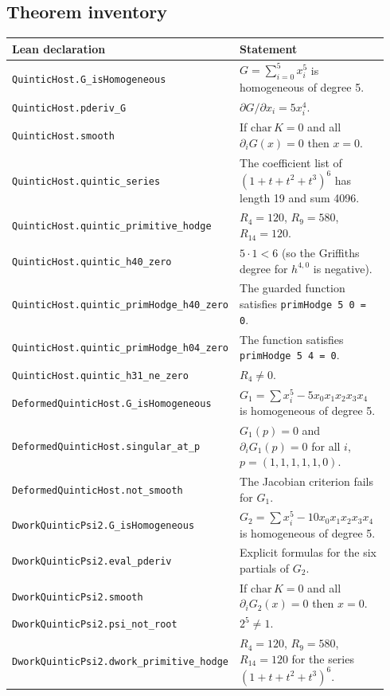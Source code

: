 \documentclass[11pt]{article}
\theoremstyle{definition}\newtheorem{definition}[theorem]{Definition}\newtheorem{remark}[theorem]{Remark}
\begin{document}
\subsection{Theorem inventory}
\begin{center}\small
\begin{longtable}{p{0.42\linewidth}p{0.52\linewidth}}
\toprule
Lean declaration & Statement\\\midrule
\texttt{QuinticHost.G\_isHomogeneous} & $G=\sum_{i=0}^5 x_i^5$ is homogeneous of degree 5.\\
\texttt{QuinticHost.pderiv\_G} & $\partial G/\partial x_i = 5x_i^4$.\\
\texttt{QuinticHost.smooth} & If $\mathrm{char}\,K=0$ and all $\partial_iG(x)=0$ then $x=0$.\\
\texttt{QuinticHost.quintic\_series} & The coefficient list of $(1+t+t^2+t^3)^6$ has length 19 and sum 4096.\\
\texttt{QuinticHost.quintic\_primitive\_hodge} & $R_4=120$, $R_9=580$, $R_{14}=120$.\\
\texttt{QuinticHost.quintic\_h40\_zero} & $5\cdot 1<6$ (so the Griffiths degree for $h^{4,0}$ is negative).\\
\texttt{QuinticHost.quintic\_primHodge\_h40\_zero} & The guarded function satisfies \texttt{primHodge 5 0 = 0}.\\
\texttt{QuinticHost.quintic\_primHodge\_h04\_zero} & The function satisfies \texttt{primHodge 5 4 = 0}.\\
\texttt{QuinticHost.quintic\_h31\_ne\_zero} & $R_4\neq 0$.\\
\texttt{DeformedQuinticHost.G\_isHomogeneous} & $G_1=\sum x_i^5-5x_0x_1x_2x_3x_4$ is homogeneous of degree 5.\\
\texttt{DeformedQuinticHost.singular\_at\_p} & $G_1(p)=0$ and $\partial_iG_1(p)=0$ for all $i$, $p=(1,1,1,1,1,0)$.\\
\texttt{DeformedQuinticHost.not\_smooth} & The Jacobian criterion fails for $G_1$.\\
\texttt{DworkQuinticPsi2.G\_isHomogeneous} & $G_2=\sum x_i^5-10x_0x_1x_2x_3x_4$ is homogeneous of degree 5.\\
\texttt{DworkQuinticPsi2.eval\_pderiv} & Explicit formulas for the six partials of $G_2$.\\
\texttt{DworkQuinticPsi2.smooth} & If $\mathrm{char}\,K=0$ and all $\partial_iG_2(x)=0$ then $x=0$.\\
\texttt{DworkQuinticPsi2.psi\_not\_root} & $2^5\neq 1$.\\
\texttt{DworkQuinticPsi2.dwork\_primitive\_hodge} & $R_4=120$, $R_9=580$, $R_{14}=120$ for the series $(1+t+t^2+t^3)^6$.\\
\bottomrule
\end{longtable}\end{center}
\end{document}
